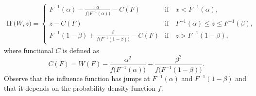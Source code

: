 \documentclass[a4paper,11pt]{scrreprt}
\theoremstyle{remark}
\begin{document}
\begin{align*}
   \mathrm{IF}\big(W, z\big) = 
   \begin{cases}
      F^{-1}(\alpha) - \frac{\alpha}{f\big(F^{-1}(\alpha)\big)} - C(F) & \text{if} \quad x < F^{-1}(\alpha),\\
      z - C(F) & \text{if} \quad F^{-1}(\alpha) \leq z \leq F^{-1}(\beta),\\
      F^{-1}(1-\beta) + \frac{\beta}{f\big(F^{-1}(1-\beta)\big)}- C(F) & \text{if} \quad z > F^{-1}(1-\beta), 
   \end{cases}
\end{align*}
\noindent where functional $C$ is defined as
\begin{equation*}
   C(F) = W(F) - \frac{\alpha^2}{f\big(F^{-1}(\alpha)\big)} - \frac{\beta^2}{f\big(F^{-1}(1-\beta)\big)}. 
\end{equation*}
\noindent Observe that the influence function has jumps at $F^{-1}(\alpha)$ and $F^{-1}(1-\beta)$ and that it depends on the probability density function $f$. 

\end{document}
